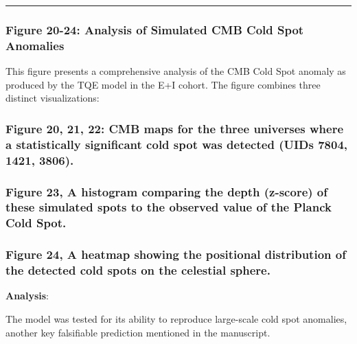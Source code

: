 \begin{center}\rule{0.5\linewidth}{0.5pt}\end{center}

\subsubsection{Figure 20-24: Analysis of Simulated CMB Cold Spot
Anomalies}\label{figure-20-24-analysis-of-simulated-cmb-cold-spot-anomalies}

This figure presents a comprehensive analysis of the CMB Cold Spot
anomaly as produced by the TQE model in the E+I cohort. The figure
combines three distinct visualizations:

\subsubsection{Figure 20, 21, 22: CMB maps for the three universes where
a statistically significant cold spot was detected (UIDs 7804, 1421,
3806).}\label{figure-20-21-22-cmb-maps-for-the-three-universes-where-a-statistically-significant-cold-spot-was-detected-uids-7804-1421-3806.}

\subsubsection{Figure 23, A histogram comparing the depth (z-score) of
these simulated spots to the observed value of the Planck Cold
Spot.}\label{figure-23-a-histogram-comparing-the-depth-z-score-of-these-simulated-spots-to-the-observed-value-of-the-planck-cold-spot.}

\subsubsection{Figure 24, A heatmap showing the positional distribution
of the detected cold spots on the celestial
sphere.}\label{figure-24-a-heatmap-showing-the-positional-distribution-of-the-detected-cold-spots-on-the-celestial-sphere.}

\textbf{Analysis}:

The model was tested for its ability to reproduce large-scale cold spot
anomalies, another key falsifiable prediction mentioned in the
manuscript.

